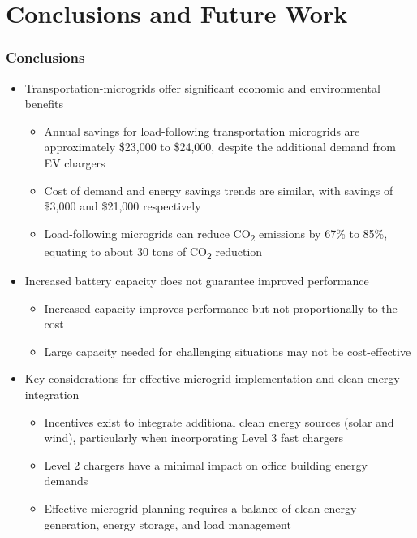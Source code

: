 \documentclass[aspectratio=169, 8 pt]{beamer}
\begin{document}
	\section{Conclusions and Future Work}		
	
	\begin{frame}
		\frametitle{Conclusions}
		\begin{itemize} \Large
			\item Transportation-microgrids offer significant economic and environmental benefits
			\begin{itemize} \large
				\item Annual savings for load-following transportation microgrids are approximately \$23,000 to \$24,000, despite the additional demand from EV chargers
				\item Cost of demand and energy savings trends are similar, with savings of \$3,000 and \$21,000 respectively
				\item Load-following microgrids can reduce CO\textsubscript{2} emissions by 67\% to 85\%, equating to about 30 tons of CO\textsubscript{2} reduction
			\end{itemize}
			\item Increased battery capacity does not guarantee improved performance
			\begin{itemize} \large
				\item Increased capacity improves performance but not proportionally to the cost
				\item Large capacity needed for challenging situations may not be cost-effective 
			\end{itemize}
			\item Key considerations for effective microgrid implementation and clean energy integration
			\begin{itemize} \large
				\item Incentives exist to integrate additional clean energy sources (solar and wind), particularly when incorporating Level 3 fast chargers
				\item Level 2 chargers have a minimal impact on office building energy demands
				\item Effective microgrid planning requires a balance of clean energy generation, energy storage, and load management
			\end{itemize}
		\end{itemize}
	\end{frame}
\end{document}
